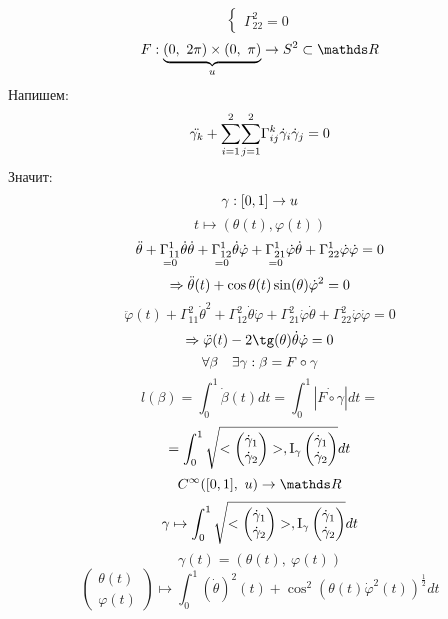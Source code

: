 \documentclass[main]{subfiles}
\begin{document}
\begin{sol}
\[\begin{cases}
            \Gamma_{22}^2 = 0
        \end{cases}\]
        \[F: \ub{u}{(0,\ 2\pi) \times (0,\ \pi)} \ra S^2 \subset \R\]
        Напишем:
        \[\ddot{\gamma_k} + \underset{i=1}{\overset{2}{\sum}} \underset{j=1}{\overset{2}{\sum}} \Gamma_{ij}^k \dot{\gamma}_i \dot{\gamma}_j = 0\]
        Значит:
        \[\gamma: [0,1] \rightarrow u\]
        \[t \mapsto (\theta(t), \varphi(t))\]
        \[\ddot{\theta} + \underset{=0}{\Gamma_{11}^1} \dot{\theta} \dot{\theta} + \underset{=0}{\Gamma_{12}^1} \dot{\theta} \dot{\varphi} + \underset{=0}{\Gamma_{21}^1} \dot{\varphi} \dot{\theta} + \Gamma_{22}^1 \dot{\varphi} \dot{\varphi} = 0\]
        \[\Rightarrow \ddot{\theta}(t) + \cos \theta(t) \sin (\theta) \dot{\varphi}^2 = 0\]
        \[\ddot{\varphi}(t) + \Gamma_{11}^2 \dot{\theta}^2 + \Gamma_{12}^2 \dot{\theta} \dot{\varphi} + \Gamma_{21}^2 \dot{\varphi} \dot{\theta} + \Gamma_{22}^2 \dot{\varphi} \dot{\varphi} = 0\]
        \[\Ra \ddot{\varphi}(t) - 2\tg(\theta) \dot{\theta} \dot{\varphi} = 0\]
        \[\forall \beta \quad \exists \gamma: \beta = F \circ \gamma\]
        \[l(\beta) = \int_0^1 \dot{\beta}(t) dt = \int_0^1 |\dot{F \circ \gamma}| dt =\]
        \[= \int_0^1 \sqrt{<\begin{pmatrix}
            \dot{\gamma}_1\\
            \dot{\gamma}_2
        \end{pmatrix}>, \RNumb{1}_{\gamma} \begin{pmatrix}
            \dot{\gamma}_1\\
            \dot{\gamma}_2
        \end{pmatrix}} dt\]
        \[C^{\infty}([0,1],\ u) \ra \R\]
        \[\gamma \mapsto \int_0^1 \sqrt{<\begin{pmatrix}
            \dot{\gamma}_1\\
            \dot{\gamma}_2
        \end{pmatrix}>, \RNumb{1}_{\gamma} \begin{pmatrix}
            \dot{\gamma}_1\\
            \dot{\gamma}_2
        \end{pmatrix}} dt\]
        \[\gamma(t) = (\theta(t),\ \varphi(t))\]
        \[\begin{pmatrix}
            \theta(t)\\
            \varphi(t)
        \end{pmatrix} \mapsto \int_0^1 (\dot{\theta})^2 (t) + \cos^2 (\theta(t) \dot{\varphi}^2 (t))^{\frac{1}{2}} dt\]

\end{sol}
\end{document}
